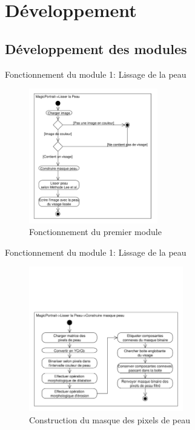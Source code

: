 \documentclass{beamer}
\begin{document}
\section{Développement}

\subsection{Développement des modules}

\begin{frame}{Fonctionnement du module 1: Lissage de la peau}
\begin{figure}
\centering
\includegraphics[width=0.5\textwidth]{DiagrammeActivites_10_LissagePeau}
\caption{Fonctionnement du premier module}
\end{figure}
\end{frame}

\begin{frame}{Fonctionnement du module 1: Lissage de la peau}
\begin{figure}
\centering
\includegraphics[width=0.6\textwidth]{DiagrammeActivites_11_LissagePeau_Masque}
\caption{Construction du masque des pixels de peau}
\end{figure}
\end{frame}
\end{document}
